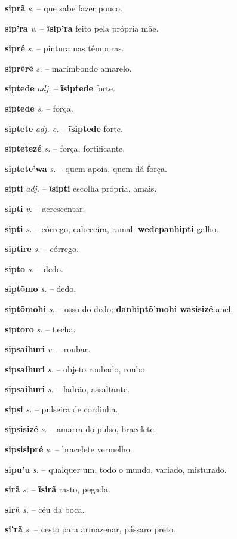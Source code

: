 \textbf{siprã} \textit{s.} -- que sabe fazer pouco.

\textbf{sip'ra} \textit{v.} -- \textbf{ĩsip'ra} feito pela própria mãe.

\textbf{sipré} \textit{s.} -- pintura nas têmporas.

\textbf{siprẽrẽ} \textit{s.} -- marimbondo amarelo.

\textbf{siptede} \textit{adj.} -- \textbf{ĩsiptede} forte.

\textbf{siptede} \textit{s.} -- força.

\textbf{siptete} \textit{adj. c.} -- \textbf{ĩsiptede} forte.

\textbf{siptetezé} \textit{s.} -- força, fortificante.

\textbf{siptete'wa} \textit{s.} -- quem apoia, quem dá força.

\textbf{sipti} \textit{adj.} -- \textbf{ĩsipti} escolha própria, amais.

\textbf{sipti} \textit{v.} -- acrescentar.

\textbf{sipti} \textit{s.} -- córrego, cabeceira, ramal; \textbf{wedepanhipti} galho.

\textbf{siptire} \textit{s.} -- córrego.

\textbf{sipto} \textit{s.} -- dedo.

\textbf{siptõmo} \textit{s.} -- dedo.

\textbf{siptõmohi} \textit{s.} -- osso do dedo; \textbf{danhiptõ'mohi wasisizé} anel.

\textbf{siptoro} \textit{s.} -- flecha.

\textbf{sipsaihuri} \textit{v.} -- roubar.

\textbf{sipsaihuri} \textit{s.} -- objeto roubado, roubo.

\textbf{sipsaihuri} \textit{s.} -- ladrão, assaltante.

\textbf{sipsi} \textit{s.} -- pulseira de cordinha.

\textbf{sipsisizé} \textit{s.} -- amarra do pulso, bracelete.

\textbf{sipsisipré} \textit{s.} -- bracelete vermelho.

\textbf{sipu'u} \textit{s.} -- qualquer um, todo o mundo, variado, misturado.

\textbf{sirã} \textit{s.} -- \textbf{ĩsirã} rasto, pegada.

\textbf{sirã} \textit{s.} -- céu da boca.

\textbf{si'rã} \textit{s.} -- cesto para armazenar, pássaro preto.

